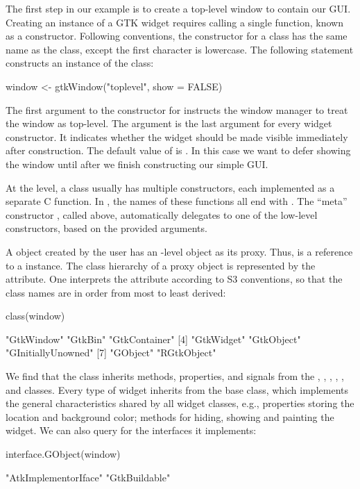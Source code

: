 The first step in our example is to create a top-level window to
contain our GUI.  Creating an instance of a GTK\/ widget requires
calling a single \R\/ function, known as a constructor. Following \R\/
conventions, the constructor for a class has the same name as the
class, except the first character is lowercase. The following
statement constructs an instance of the  class:
\begin{Schunk}
\begin{Sinput}
 window <- gtkWindow("toplevel", show = FALSE)
\end{Sinput}
\end{Schunk}
%
The first argument to the constructor for  instructs
the window manager to treat the window as top-level.  The 
argument is the last argument for every widget constructor. It
indicates whether the widget should be made visible immediately after
construction.  The default value of  is . In
this case we want to defer showing the window until after we finish
constructing our simple GUI.

At the \GTK\/ level, a class usually has multiple constructors, each
implemented as a separate C function. In , the names of
these functions all end with . The ``meta'' constructor
, called above, automatically delegates to one of
the low-level constructors, based on the provided arguments.

A \GTK\/ object created by the \R\/ user has an \R-level object as its
proxy. Thus,  is a reference to a 
instance.  The class hierarchy of a proxy object is represented by the
 attribute. One interprets the attribute according to S3
conventions, so that the class names are in order from most to least
derived:
\begin{Schunk}
\begin{Sinput}
 class(window)
\end{Sinput}
\begin{Soutput}
[1] "GtkWindow"         "GtkBin"            "GtkContainer"     
[4] "GtkWidget"         "GtkObject"         "GInitiallyUnowned"
[7] "GObject"           "RGtkObject"       
\end{Soutput}
\end{Schunk}
%
We find that the  class inherits methods,
properties, and signals from the , ,
, , , and
 classes. Every type of  widget inherits from
the base  class, which implements the general
characteristics shared by all widget classes, e.g., properties storing
the location and background color; methods for hiding, showing and
painting the widget. We can also query  for the
interfaces it implements:
\begin{Schunk}
\begin{Sinput}
 interface.GObject(window)
\end{Sinput}
\begin{Soutput}
[1] "AtkImplementorIface" "GtkBuildable"       
\end{Soutput}
\end{Schunk}

